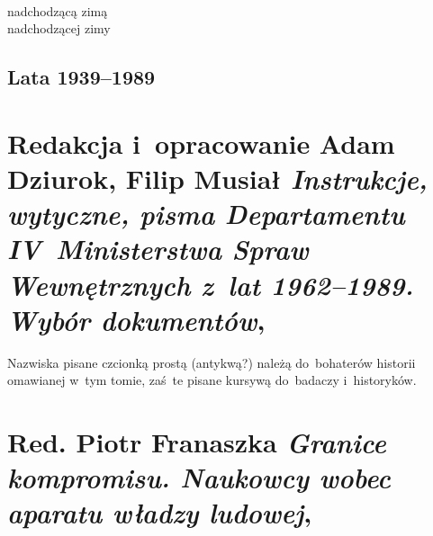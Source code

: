 \documentclass[a4paper,11pt]{article}
\numberwithin{equation}{section}
\begin{document}
\VerSpaceTwo


\noindent
{} \\
\Jest nadchodzącą zimą \\
\PowinnoByc nadchodzącej zimy \\












\subsection{Lata 1939--1989}

\VerSpaceThree



\section{ %
  Redakcja i~opracowanie Adam Dziurok, Filip Musiał
  \textit{Instrukcje, wytyczne, pisma Departamentu
    IV~Ministerstwa Spraw Wewnętrznych z~lat 1962--1989.
    Wybór dokumentów},
  \cite{RedDziurokMusialInstrukcjeWytycznePisma2017} }




 Nazwiska pisane czcionką prostą (antykwą?) należą
do~bohaterów historii omawianej w~tym tomie, zaś~te pisane kursywą
do~badaczy i~historyków.


\VerSpaceTwo










\section{Red. Piotr Franaszka \textit{Granice kompromisu.
    Naukowcy wobec aparatu władzy ludowej},
  \cite{RedFranaszekGraniceKompromisu2015} }


\end{document}
